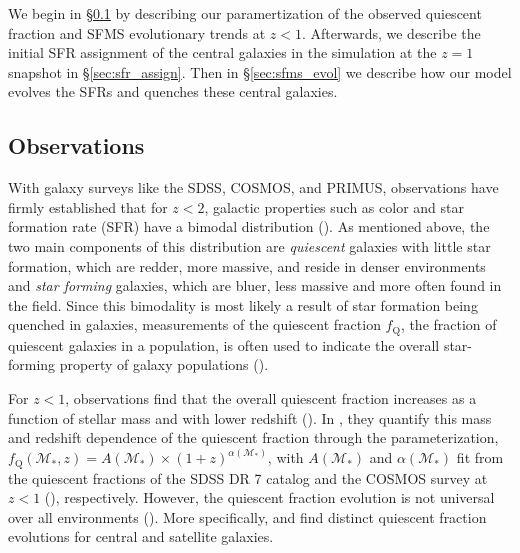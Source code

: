 \documentclass[iop,apj,tighten,twocolappendix,numberedappendix]{emulateapj}
\begin{document}
We begin in \S \ref{sec:obvs} by describing our paramertization 
of the observed quiescent fraction and SFMS evolutionary trends at 
$z < 1$. Afterwards, we describe the initial SFR assignment of the
central galaxies in the simulation at the $z = 1$ snapshot in \S \ref{sec:sfr_assign}. 
Then in \S \ref{sec:sfms_evol} we describe how our model evolves 
the SFRs and quenches these central galaxies. 

\subsection{Observations} \label{sec:obvs}
With galaxy surveys like the SDSS, COSMOS, and PRIMUS, observations 
have firmly established that for $z < 2$, galactic properties such as 
color and star formation rate (SFR) have a bimodal distribution 
(\citealt{Baldry:2006aa, Cooper:2007aa, Blanton:2009aa, Moustakas:2013aa}).
As mentioned above, the two main components of this distribution are 
{\em quiescent} galaxies with little star formation, which are redder, 
more massive, and reside in denser environments and {\em star forming} 
galaxies, which are bluer, less massive and more often found in the field. 
Since this bimodality is most likely a result of star formation being 
quenched in galaxies, measurements of the quiescent fraction 
$f_\mathrm{Q}$, the fraction of quiescent galaxies in a population, is often 
used to indicate the overall star-forming property of galaxy populations 
(\citealt{Baldry:2006aa, Drory:2009aa, Cooper:2010aa, Iovino:2010aa, Peng:2010aa, 
Geha:2012aa, Kovac:2014aa, Hahn:2015aa}).

For $z < 1$, observations find that the overall quiescent fraction increases as a 
function of stellar mass and with lower redshift (\citealt{Drory:2009aa, Iovino:2010aa, 
Peng:2010aa, Kovac:2014aa, Hahn:2015aa}). In \cite{Wetzel:2013aa}, they quantify 
this mass and redshift dependence of the quiescent fraction through the parameterization, 
$f_\mathrm{Q} (\mathcal{M}_*, z) = A(\mathcal{M}_*) \times (1+z)^{\alpha(\mathcal{M}_*)}$,
with $A(\mathcal{M}_*)$ and $\alpha(\mathcal{M}_*)$ fit from the quiescent fractions of 
the SDSS DR 7 catalog and the COSMOS survey at $z < 1$ (\citealt{Drory:2009aa}), 
respectively. However, the quiescent fraction evolution is not universal over
all environments (\citealt{Hahn:2015aa}). More specifically, \cite{Tinker:2010aa} 
and \cite{Tinker:2013aa} find distinct quiescent fraction evolutions 
for central and satellite galaxies. 
\end{document}
